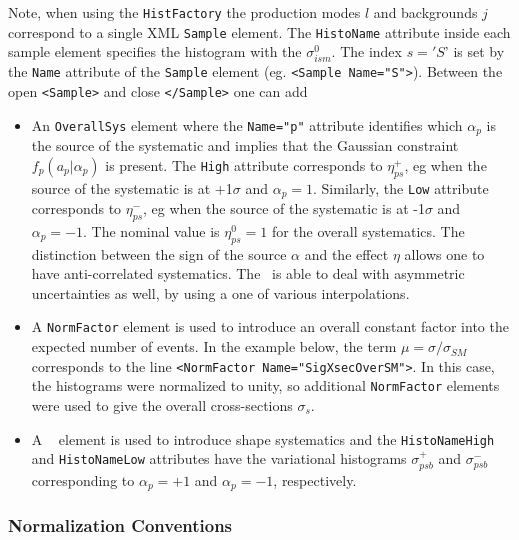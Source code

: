 Note, when using the {\tt HistFactory} the production modes $l$ and backgrounds $j$ correspond to a single XML {\tt Sample} element.  The   {\tt HistoName} attribute inside each sample element specifies the histogram with the  $\sigma_{ism}^0$.   The index $s='S$' is set by the {\tt Name} attribute of the {\tt Sample} element (eg. {\tt <Sample Name="S">}). Between the open {\tt <Sample>} and close {\tt </Sample>} one can add
\begin{itemize}
 \item An {\tt OverallSys} element where the {\tt Name="p"} attribute identifies which $\alpha_p$ is the source of the systematic and implies that the Gaussian constraint $f_p(a_p|\alpha_p)$ is present.  The {\tt High} attribute  corresponds to $\eta^+_{ps}$, eg when the source of the systematic is at +1$\sigma$ and $\alpha_p=1$.  Similarly, the {\tt Low} attribute corresponds to $\eta^-_{ps}$, eg when the source of the systematic is at -1$\sigma$ and $\alpha_p=-1$. The nominal value is $\eta^0_{ps}=1$ for the overall systematics. The distinction between the sign of the source $\alpha$ and the effect $\eta$ allows one to have anti-correlated systematics. The \HF\ is able to deal with asymmetric uncertainties as well, by using a  one of various interpolations.
 \item A {\tt NormFactor} element is used to introduce an overall constant factor into the expected number of events.  In the example below, the term $\mu=\sigma/\sigma_{SM}$ corresponds to the line {\tt <NormFactor Name="SigXsecOverSM">}.  In this case, the histograms were normalized to unity, so additional {\tt NormFactor} elements were used to give the overall cross-sections $\sigma_{s}$.
 \item A {\tt \HS\ } element is used to introduce shape systematics and the {\tt HistoNameHigh} and {\tt HistoNameLow} attributes have the variational histograms $\sigma_{psb}^+ $ and $\sigma_{psb}^- $ corresponding to $\alpha_p=+1$ and $\alpha_p=-1$, respectively.
\end{itemize}

\subsubsection{Normalization Conventions}




